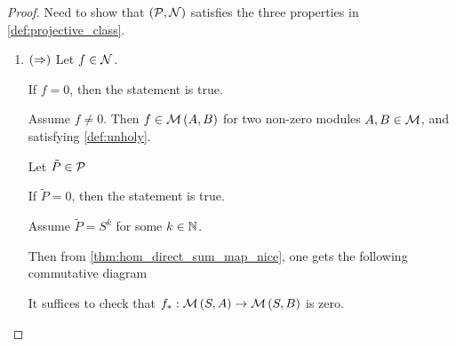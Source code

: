 \begin{proof}
    Need to show that \( \left(  {\mathcal{P}}, {\mathcal{N}}  \right) \) satisfies the three properties in \autoref{def:projective_class}.

    \begin{enumerate}
        \item {
            \( \left(  \Rightarrow  \right) \) Let \( f \in {\mathcal{N}} \).

            If \( f = 0 \), then the statement is true.

            Assume \( f \neq 0 \). Then \( f \in {\mathcal{M}}\left( A, B \right) \) for two non-zero modules \( A, B \in {\mathcal{M}} \), and satisfying \autoref{def:unholy}.
            
            Let \( \tilde{P} \in {\mathcal{P}} \)
            
            If \( \tilde{P} = 0 \), then the statement is true.

            Assume \( \tilde{P} = S^k \) for some \( k \in {\mathbb{N}} \).

            Then from \autoref{thm:hom_direct_sum_map_nice}, one gets the following commutative diagram
            \begin{center}
            \end{center}
            It suffices to check that \( f_*: {\mathcal{M}}\left( S, A \right) \to {\mathcal{M}}\left( S, B \right) \) is zero.

}
\end{enumerate}
\end{proof}
